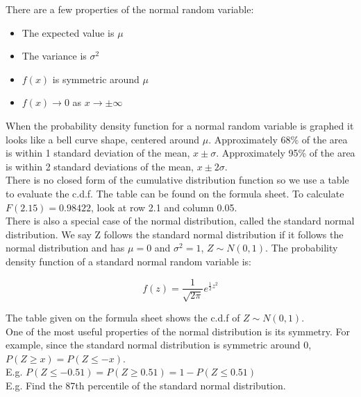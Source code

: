 \documentclass[12pt, letterpaper]{article}
\begin{document}
There are a few properties of the normal random variable:
\begin{itemize}
\item The expected value is $\mu$
\item The variance is $\sigma^2$
\item $f\left(x\right)$ is symmetric around $\mu$
\item $f\left(x\right) \rightarrow 0$ as $x \rightarrow \pm \infty$
\end{itemize}

When the probability density function for a normal random variable is graphed it looks like a bell curve shape, centered around \(\mu\). Approximately 68\% of the area is within 1 standard deviation of the mean, \(x \pm \sigma\). Approximately 95\% of the area is within 2 standard deviations of the mean, \(x \pm 2\sigma\).\\

There is no closed form of the cumulative distribution function so we use a table to evaluate the c.d.f. The table can be found on the formula sheet. To calculate \(F\left(2.15\right) = 0.98422\), look at row 2.1 and column 0.05.\\

There is also a special case of the normal distribution, called the standard normal distribution. We say Z follows the standard normal distribution if it follows the normal distribution and has \(\mu = 0\) and \(\sigma^2 = 1\), \(Z \sim N(0, 1)\). The probability density function of a standard normal random variable is:

\begin{equation}
f\left(z\right) = \frac{1}{\sqrt{2\pi}} e^{\frac{1}{2} z^2}
\end{equation}

The table given on the formula sheet shows the c.d.f of \(Z \sim N(0, 1)\).\\

One of the most useful properties of the normal distribution is its symmetry. For example, since the standard normal distribution is symmetric around 0, \(P\left(Z \geq x\right) = P\left(Z \leq -x\right)\).\\

E.g. \(P\left(Z \leq -0.51\right) = P\left(Z \geq 0.51\right) = 1 - P\left(Z \leq 0.51\right)\)\\

E.g. Find the 87th percentile of the standard normal distribution.\\
\end{document}
